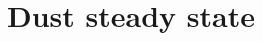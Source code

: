 \documentclass[apj]{emulateapj}
\begin{document}









\section{Dust steady state} 
\label{sect:model-equations}
\end{document}
